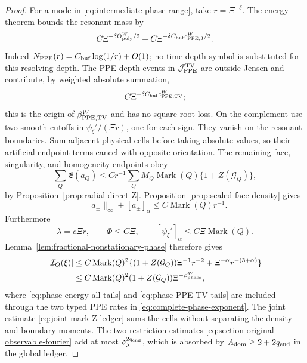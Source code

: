 \documentclass[11pt]{article}
\begin{document}
\begin{proof}
For a mode in \eqref{eq:intermediate-phase-range}, take
\(r=\Xi^{-\delta}\).  The energy theorem bounds the resonant mass by
\begin{equation}
\label{eq:phase-energy-all-tails}
 C\Xi^{-\delta\Theta_{\rm poly}^{W}/2}
 +C\Xi^{-\delta C_{\rm buf}c_{\rm PPE,J}^{W}/2}.
\end{equation}
Indeed $N_{\rm PPE}(r)=C_{\rm buf}\log(1/r)+O(1)$; no time-depth symbol is
substituted for this resolving depth.  The PPE-depth events in
$\mathcal J_{\rm PPE}^{\rm TV}$ are outside Jensen and contribute, by
weighted absolute summation,
\begin{equation}
\label{eq:phase-PPE-TV-tails}
 C\Xi^{-\delta C_{\rm buf}c_{\rm PPE,TV}^{W}};
\end{equation}
this is the origin of $\beta_{\rm PPE,TV}^{W}$ and has no square-root loss.
On the complement use two smooth
cutoffs in
\(\psi_\xi'/(\Xi r)\), one for each sign.  They vanish on the resonant
boundaries.  Sum adjacent physical cells before taking absolute values, so
their artificial endpoint terms cancel with opposite orientation.  The
remaining face, singularity, and homogeneity endpoints obey
\begin{equation}
\label{eq:phase-endpoint-ledger}
 \sum_Q\mathfrak E(a_Q)
 \le Cr^{-1}\sum_QM_Q\operatorname{Mark}(Q)
       \{1+Z(\mathcal G_Q)\},
\end{equation}
by Proposition~\ref{prop:radial-direct-Z}.  Proposition
\ref{prop:scaled-face-density} gives
\[
 \|a_\pm\|_\infty+[a_\pm]_\alpha
 \le C\operatorname{Mark}(Q) r^{-1}.
\]
Furthermore
\[
 \lambda=c\Xi r,\qquad
 \Phi\le C\Xi,\qquad
 [\psi_\xi']_\alpha\le C\Xi\operatorname{Mark}(Q).
\]
Lemma~\ref{lem:fractional-nonstationary-phase} therefore gives
\begin{align*}
 |\mathcal I_Q(\xi)|
 &\le C\operatorname{Mark}(Q)^2
 \{(1+Z(\mathcal G_Q))\Xi^{-1}r^{-2}
        +\Xi^{-\alpha}r^{-(3+\alpha)}\}\\
 &\le C\operatorname{Mark}(Q)^2(1+Z(\mathcal G_Q))
       \Xi^{-\beta_{\rm phase}^{W}},
\end{align*}
where \eqref{eq:phase-energy-all-tails} and
\eqref{eq:phase-PPE-TV-tails} are included through the two typed PPE rates
in \eqref{eq:complete-phase-exponent}.
The joint estimate \eqref{eq:joint-mark-Z-ledger} sums the cells without
separating the density and boundary moments.  The two restriction estimates
\eqref{eq:section-original-observable-fourier} add at most
$\mathfrak d_\lambda^{2q_{\rm end}}$, which is absorbed by
$A_{\rm dom}\ge2+2q_{\rm end}$ in the global ledger.


\end{proof}
\end{document}
